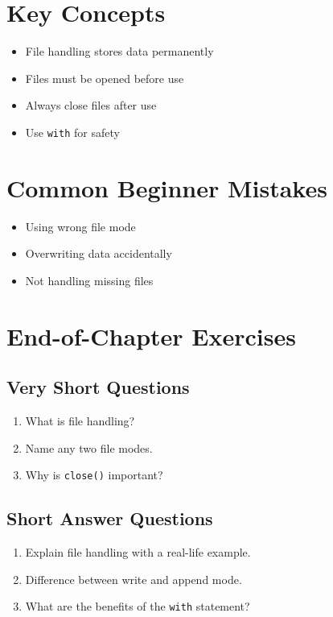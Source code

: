 \section{Key Concepts}

\begin{itemize}
    \item File handling stores data permanently
    \item Files must be opened before use
    \item Always close files after use
    \item Use \texttt{with} for safety
\end{itemize}

\section{Common Beginner Mistakes}

\begin{itemize}
    \item Using wrong file mode
    \item Overwriting data accidentally
    \item Not handling missing files
\end{itemize}

\section{End-of-Chapter Exercises}

\subsection{Very Short Questions}

\begin{enumerate}
    \item What is file handling?
    \item Name any two file modes.
    \item Why is \texttt{close()} important?
\end{enumerate}

\subsection{Short Answer Questions}

\begin{enumerate}
    \item Explain file handling with a real-life example.
    \item Difference between write and append mode.
    \item What are the benefits of the \texttt{with} statement?
\end{enumerate}

